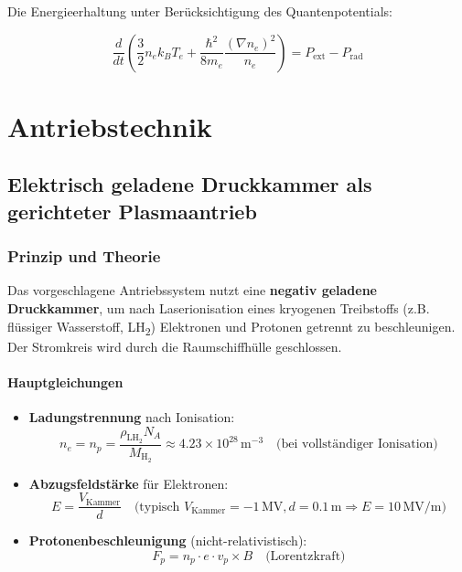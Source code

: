Die Energieerhaltung unter Berücksichtigung des Quantenpotentials:

\begin{equation}
\label{eq:energy}
\frac{d}{dt}\left(\frac{3}{2}n_e k_B T_e + \frac{\hbar^2}{8m_e} \frac{(\nabla n_e)^2}{n_e}\right) = P_{\text{ext}} - P_{\text{rad}}
\end{equation}

\chapter{Antriebstechnik}
\section{Elektrisch geladene Druckkammer als gerichteter Plasmaantrieb}
\label{sec:plasma-antrieb}

\subsection{Prinzip und Theorie}
Das vorgeschlagene Antriebssystem nutzt eine \textbf{negativ geladene Druckkammer}, um nach Laserionisation eines kryogenen Treibstoffs (z.B. flüssiger Wasserstoff, LH\textsubscript{2}) Elektronen und Protonen getrennt zu beschleunigen. Der Stromkreis wird durch die Raumschiffhülle geschlossen.

\subsubsection*{Hauptgleichungen}
\begin{itemize}
    \item \textbf{Ladungstrennung} nach Ionisation:
        \begin{equation}
            n_e = n_p = \frac{\rho_{\text{LH}_2} N_A}{M_{\text{H}_2}} \approx 4.23 \times 10^{28}\,\text{m}^{-3} \quad \text{(bei vollständiger Ionisation)}
            \label{eq:dichte}
        \end{equation}
    
    \item \textbf{Abzugsfeldstärke} für Elektronen:
        \begin{equation}
            E = \frac{V_{\text{Kammer}}}{d} \quad \text{(typisch } V_{\text{Kammer}} = -1\,\text{MV}, d = 0.1\,\text{m} \Rightarrow E = 10\,\text{MV/m})
            \label{eq:feld}
        \end{equation}
    
    \item \textbf{Protonenbeschleunigung} (nicht-relativistisch):
        \begin{equation}
            F_p = n_p \cdot e \cdot v_p \times B \quad \text{(Lorentzkraft)}
            \label{eq:lorentz_2}
        \end{equation}
\end{itemize}

